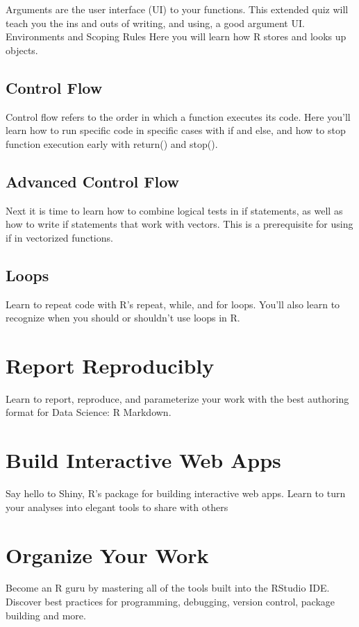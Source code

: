 \documentclass[
]{article}
\begin{document}
Arguments are the user interface (UI) to your functions. This extended
quiz will teach you the ins and outs of writing, and using, a good
argument UI. Environments and Scoping Rules Here you will learn how R
stores and looks up objects.

\hypertarget{control-flow}{%
\subsection{Control Flow}\label{control-flow}}

Control flow refers to the order in which a function executes its code.
Here you'll learn how to run specific code in specific cases with if and
else, and how to stop function execution early with return() and stop().

\hypertarget{advanced-control-flow}{%
\subsection{Advanced Control Flow}\label{advanced-control-flow}}

Next it is time to learn how to combine logical tests in if statements,
as well as how to write if statements that work with vectors. This is a
prerequisite for using if in vectorized functions.

\hypertarget{loops}{%
\subsection{Loops}\label{loops}}

Learn to repeat code with R's repeat, while, and for loops. You'll also
learn to recognize when you should or shouldn't use loops in R.

\hypertarget{report-reproducibly}{%
\section{Report Reproducibly}\label{report-reproducibly}}

Learn to report, reproduce, and parameterize your work with the best
authoring format for Data Science: R Markdown.

\hypertarget{build-interactive-web-apps}{%
\section{Build Interactive Web Apps}\label{build-interactive-web-apps}}

Say hello to Shiny, R's package for building interactive web apps. Learn
to turn your analyses into elegant tools to share with others

\hypertarget{organize-your-work}{%
\section{Organize Your Work}\label{organize-your-work}}

Become an R guru by mastering all of the tools built into the RStudio
IDE. Discover best practices for programming, debugging, version
control, package building and more.
\end{document}
